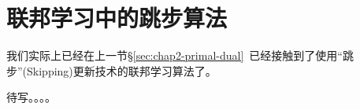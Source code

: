 \section{联邦学习中的跳步算法}
\label{sec:chap2-skip-alg}


我们实际上已经在上一节\S\ref{sec:chap2-primal-dual}~已经接触到了使用``跳步''(Skipping)更新技术的联邦学习算法了。

待写。。。。
